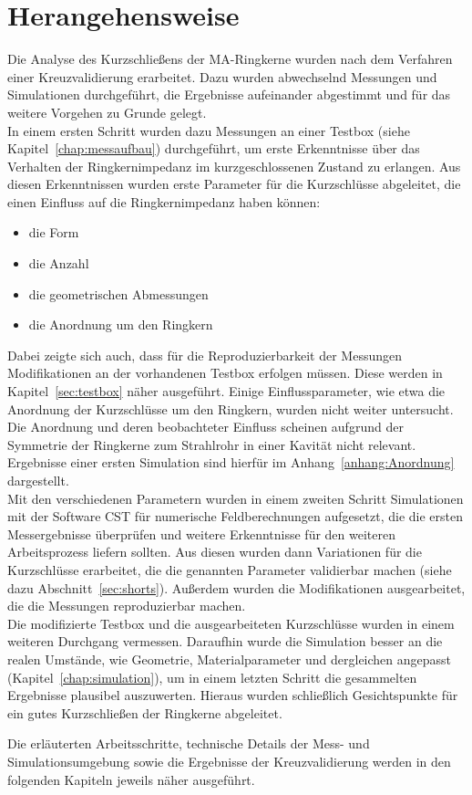 \section{Herangehensweise}
Die Analyse des Kurzschließens der MA-Ringkerne wurden nach dem Verfahren einer Kreuzvalidierung erarbeitet. Dazu wurden abwechselnd Messungen und Simulationen durchgeführt, die Ergebnisse aufeinander abgestimmt und für das weitere Vorgehen zu Grunde gelegt.\\
In einem ersten Schritt wurden dazu Messungen an einer Testbox (siehe Kapitel~\ref{chap:messaufbau}) durchgeführt, um erste Erkenntnisse über das Verhalten der Ringkernimpedanz im kurzgeschlossenen Zustand zu erlangen. Aus diesen Erkenntnissen wurden erste Parameter für die Kurzschlüsse abgeleitet, die einen Einfluss auf die Ringkernimpedanz haben können:
    \begin{itemize}
        \item die Form
        \item die Anzahl
        \item die geometrischen Abmessungen
        \item die Anordnung um den Ringkern
    \end{itemize}
Dabei zeigte sich auch, dass für die Reproduzierbarkeit der Messungen Modifikationen an der vorhandenen Testbox erfolgen müssen. Diese werden in Kapitel~\ref{sec:testbox} näher ausgeführt. Einige Einflussparameter, wie etwa die Anordnung der Kurzschlüsse um den Ringkern, wurden nicht weiter untersucht. Die Anordnung und deren beobachteter Einfluss scheinen aufgrund der Symmetrie der Ringkerne zum Strahlrohr in einer Kavität nicht relevant. Ergebnisse einer ersten Simulation sind hierfür im Anhang~\ref{anhang:Anordnung} dargestellt.\\
Mit den verschiedenen Parametern wurden in einem zweiten Schritt Simulationen mit der Software CST für numerische Feldberechnungen aufgesetzt, die die ersten Messergebnisse überprüfen und weitere Erkenntnisse für den weiteren Arbeitsprozess liefern sollten. Aus diesen wurden dann Variationen für die Kurzschlüsse erarbeitet, die die genannten Parameter validierbar machen (siehe dazu Abschnitt~\ref{sec:shorts}). Außerdem wurden die Modifikationen ausgearbeitet, die die Messungen reproduzierbar machen.\\
Die modifizierte Testbox und die ausgearbeiteten Kurzschlüsse wurden in einem weiteren Durchgang vermessen. Daraufhin wurde die Simulation besser an die realen Umstände, wie Geometrie, Materialparameter und dergleichen angepasst (Kapitel~\ref{chap:simulation}), um in einem letzten Schritt die gesammelten Ergebnisse plausibel auszuwerten. Hieraus wurden schließlich Gesichtspunkte für ein gutes Kurzschließen der Ringkerne abgeleitet.
\par
Die erläuterten Arbeitsschritte, technische Details der Mess- und Simulationsumgebung sowie die Ergebnisse der Kreuzvalidierung werden in den folgenden Kapiteln jeweils näher ausgeführt.